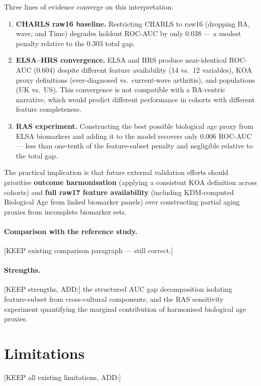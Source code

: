 \documentclass[11pt,a4paper]{article}
\begin{document}
Three lines of evidence converge on this interpretation:
\begin{enumerate}
  \item \textbf{CHARLS raw16 baseline.} Restricting CHARLS to raw16 (dropping BA,
        wave, and Time) degrades holdout ROC-AUC by only $0.038$ — a modest penalty
        relative to the $0.303$ total gap.
  \item \textbf{ELSA--HRS convergence.} ELSA and HRS produce near-identical ROC-AUC
        ($0.604$) despite different feature availability (14 vs.\ 12 variables),
        KOA proxy definitions (ever-diagnosed vs.\ current-wave arthritis), and
        populations (UK vs.\ US). This convergence is not compatible with a
        BA-centric narrative, which would predict different performance in cohorts
        with different feature completeness.
  \item \textbf{RAS experiment.} Constructing the best possible biological age proxy
        from ELSA biomarkers and adding it to the model recovers only $0.006$
        ROC-AUC — less than one-tenth of the feature-subset penalty and negligible
        relative to the total gap.
\end{enumerate}

The practical implication is that future external validation efforts should
prioritise \textbf{outcome harmonisation} (applying a consistent KOA definition
across cohorts) and \textbf{full raw17 feature availability} (including
KDM-computed Biological Age from linked biomarker panels) over constructing partial
aging proxies from incomplete biomarker sets.

\paragraph{Comparison with the reference study.}
[KEEP existing comparison paragraph — still correct.]

\paragraph{Strengths.}
[KEEP strengths, ADD:] the structured AUC gap decomposition isolating feature-subset
from cross-cultural components; and the RAS sensitivity experiment quantifying the
marginal contribution of harmonised biological age proxies.

\section{Limitations}
[KEEP all existing limitations, ADD:]
\end{document}
